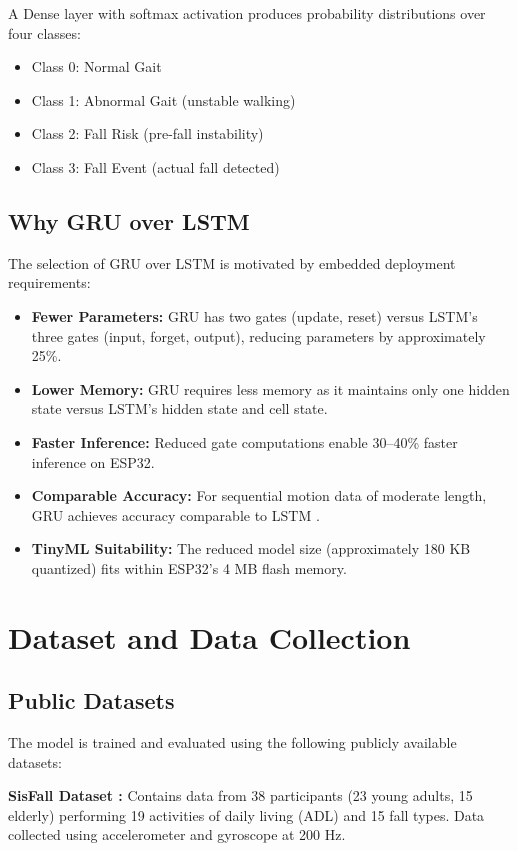\documentclass[conference]{IEEEtran}
\begin{document}
A Dense layer with softmax activation produces probability distributions over four classes:
\begin{itemize}
    \item Class 0: Normal Gait
    \item Class 1: Abnormal Gait (unstable walking)
    \item Class 2: Fall Risk (pre-fall instability)
    \item Class 3: Fall Event (actual fall detected)
\end{itemize}

\subsection{Why GRU over LSTM}

The selection of GRU over LSTM is motivated by embedded deployment requirements:

\begin{itemize}
    \item \textbf{Fewer Parameters:} GRU has two gates (update, reset) versus LSTM's three gates (input, forget, output), reducing parameters by approximately 25\%.
    \item \textbf{Lower Memory:} GRU requires less memory as it maintains only one hidden state versus LSTM's hidden state and cell state.
    \item \textbf{Faster Inference:} Reduced gate computations enable 30--40\% faster inference on ESP32.
    \item \textbf{Comparable Accuracy:} For sequential motion data of moderate length, GRU achieves accuracy comparable to LSTM \cite{li2024}.
    \item \textbf{TinyML Suitability:} The reduced model size (approximately 180 KB quantized) fits within ESP32's 4 MB flash memory.
\end{itemize}

\section{Dataset and Data Collection}

\subsection{Public Datasets}

The model is trained and evaluated using the following publicly available datasets:

\textbf{SisFall Dataset \cite{sisfall}:} Contains data from 38 participants (23 young adults, 15 elderly) performing 19 activities of daily living (ADL) and 15 fall types. Data collected using accelerometer and gyroscope at 200 Hz.
\end{document}
